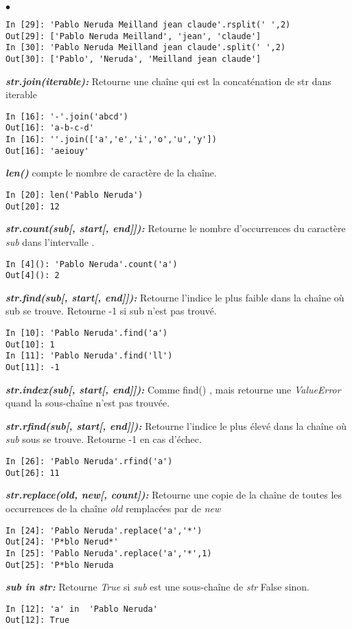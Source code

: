 \documentclass[10pt,dvipsnames,  dvips]{article}
\begin{document}
\begin{list}{$\bullet$}{}
\begin{lstlisting}
In [29]: 'Pablo Neruda Meilland jean claude'.rsplit(' ',2)
Out[29]: ['Pablo Neruda Meilland', 'jean', 'claude']
In [30]: 'Pablo Neruda Meilland jean claude'.split(' ',2)
Out[30]: ['Pablo', 'Neruda', 'Meilland jean claude']
\end{lstlisting}
\item \textit{\textbf{str.join(iterable): }} Retourne une chaîne qui est la concaténation de str dans iterable
\begin{lstlisting}
In [16]: '-'.join('abcd')
Out[16]: 'a-b-c-d'
In [16]: ''.join(['a','e','i','o','u','y'])
Out[16]: 'aeiouy'
\end{lstlisting}
\item  \textit{\textbf{len()}} compte le nombre de caractère de la chaîne.
\begin{lstlisting}
In [20]: len('Pablo Neruda')
Out[20]: 12
\end{lstlisting}
\item \textit{\textbf{str.count(sub[, start[, end]]): }} Retourne le nombre d'occurrences du caractère \textit{sub} dans l'intervalle .
\begin{lstlisting}
In [4](): 'Pablo Neruda'.count('a')
Out[4](): 2
\end{lstlisting}
\item \textit{\textbf{ str.find(sub[, start[, end]]): }} Retourne l'indice le plus faible dans la chaîne où sub se trouve. Retourne -1 si sub n'est pas trouvé.
\begin{lstlisting}
In [10]: 'Pablo Neruda'.find('a')
Out[10]: 1
In [11]: 'Pablo Neruda'.find('ll')
Out[11]: -1
\end{lstlisting}
\item \textit{\textbf{str.index(sub[, start[, end]]): }} Comme find() , mais retourne une \textit{ValueError} quand la sous-chaîne n'est pas trouvée.
\item \textit{\textbf{str.rfind(sub[, start[, end]]): }} Retourne l'indice le plus élevé dans la chaîne où \textit{sub} sous se trouve. Retourne -1 en cas d'échec.
\begin{lstlisting}
In [26]: 'Pablo Neruda'.rfind('a')
Out[26]: 11
\end{lstlisting}
\item \textit{\textbf{str.replace(old, new[, count]): }} Retourne une copie de la chaîne de toutes les occurrences de la chaîne \textit{old} remplacées par de \textit{new}
\begin{lstlisting}
In [24]: 'Pablo Neruda'.replace('a','*')
Out[24]: 'P*blo Nerud*'
In [25]: 'Pablo Neruda'.replace('a','*',1)
Out[25]: 'P*blo Neruda
\end{lstlisting}
\item  \textit{\textbf{sub in str: }} Retourne \textit{True}  si \textit{sub} est une sous-chaîne de \textit{str} False sinon.
\begin{lstlisting}
In [12]: 'a' in  'Pablo Neruda'
Out[12]: True
\end{lstlisting}
\end{list}
\end{document}
